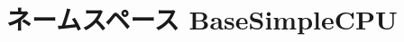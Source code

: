 \hypertarget{namespaceBaseSimpleCPU}{
\section{ネームスペース BaseSimpleCPU}
\label{namespaceBaseSimpleCPU}
}
